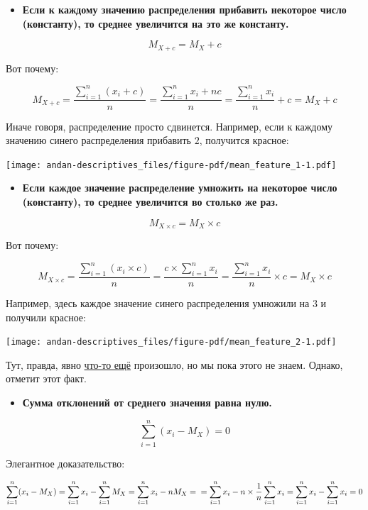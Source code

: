 \documentclass[
  letterpaper,
]{scrbook}
\providecommand{\tightlist}{%
  \setlength{\itemsep}{0pt}\setlength{\parskip}{0pt}}\usepackage{longtable,booktabs,array}
\theoremstyle{definition}
\theoremstyle{remark}
\begin{document}
\begin{itemize}
\tightlist
\item
  \textbf{Если к каждому значению распределения прибавить некоторое
  число (константу), то среднее увеличится на это же константу.}
\end{itemize}

\[
M_{X+c} = M_X + c
\]

Вот почему:

\[
M_{X+c} = \frac{\sum_{i=1}^n (x_i + c)}{n} = \frac{\sum_{i=1}^n x_i + nc}{n} = \frac{\sum_{i=1}^n x_i}{n} + c = M_X + c
\]

Иначе говоря, распределение просто сдвинется. Например, если к каждому
значению синего распределения прибавить \(2\), получится красное:

\texttt{[image: andan-descriptives\_files/figure-pdf/mean\_feature\_1-1.pdf]}

\begin{itemize}
\tightlist
\item
  \textbf{Если каждое значение распределение умножить на некоторое число
  (константу), то среднее увеличится во столько же раз.}
\end{itemize}

\[
M_{X \times c} = M_X \times c
\]

Вот почему:

\[
M_{X \times c} = \frac{\sum_{i=1}^n (x_i \times c)}{n} = \frac{c \times \sum_{i=1}^n x_i}{n} = \frac{\sum_{i=1}^n x_i}{n} \times c = M_X \times c
\]

Например, здесь каждое значение синего распределения умножили на \(3\) и
получили красное:

\texttt{[image: andan-descriptives\_files/figure-pdf/mean\_feature\_2-1.pdf]}

Тут, правда, явно \hyperref[var_features]{что-то ещё} произошло, но мы
пока этого не знаем. Однако, отметит этот факт.

\begin{itemize}
\tightlist
\item
  \textbf{Сумма отклонений от среднего значения равна нулю.}
\end{itemize}

\[
\sum_{i=1}^n(x_i - M_X) = 0
\]

Элегантное доказательство:

\[
\sum_{i=1}^n(x_i - M_X) = \sum_{i=1}^n x_i - \sum_{i=1}^n M_X = \sum_{i=1}^n x_i - nM_X = \\
= \sum_{i=1}^n x_i - n \times \frac{1}{n} \sum_{i=1}^n x_i = \sum_{i=1}^n x_i - \sum_{i=1}^n x_i = 0
\]
\end{document}
